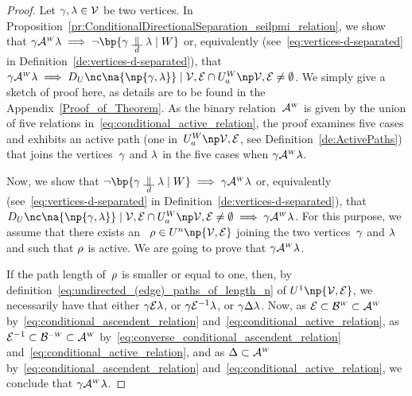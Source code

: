 \documentclass[12pt]{article}
\begin{document}
{{{{{\begin{proof}
  Let \( \gamma,\lambda \in {\cal V} \) be two vertices. 
  In Proposition~\ref{pr:ConditionalDirectionalSeparation_seilpmi_relation},
  we show that 
  \( \bgent \ConditionalActive \cgent \implies 
  \neg \bp{\bgent \ConditionalDirectionalSeparation \cgent \mid \AgentSubsetW}
  \) or, equivalently (see~\eqref{eq:vertices-d-separated} in
  Definition~\ref{de:vertices-d-separated}), that 
  \(  \bgent {\ConditionalActive} \cgent \implies
  \DeploymentInUPaths{\na{\np{\bgent,\cgent}}}{\graph} 
  \cap \ActiveUndirectedPaths{\graph} 
  \neq\emptyset \).
  We simply give a sketch of proof here, as details are to be found in the Appendix~\ref{Proof_of_Theorem}. 
  As the binary relation~\(  \mathcal{A}^{\text{\tiny $W$}} \) is given by the union of five
  relations in~\eqref{eq:conditional_active_relation},
  the proof examines five cases and exhibits an active path
  (one in~\( \ActiveUndirectedPaths{\graph} \), see Definition~\ref{de:ActivePaths})
  that joins the vertices~\( \gamma \) and \( \lambda \) in the five cases
  when \( \gamma \mathcal{A}^{\text{\tiny $W$}} \lambda \). 
  \medskip

  Now,  we show that 
  \( \neg \bp{\bgent \ConditionalDirectionalSeparation \cgent \mid \AgentSubsetW}
  \implies \bgent \ConditionalActive \cgent \) or, equivalently (see~\eqref{eq:vertices-d-separated} in
  Definition~\ref{de:vertices-d-separated}), that 
  \(
  \DeploymentInUPaths{\na{\np{\bgent,\cgent}}}{\graph} 
  \cap \ActiveUndirectedPaths{\graph} 
  \neq\emptyset 
  \implies
  \bgent {\ConditionalActive} \cgent \).
  For this purpose, we assume that there exists an \undirectedEdgePath\
  \( \UndirectedPath \in \UPATH^{n}\np{\graph} \)
  joining the two vertices~$\gamma$ and $\lambda$ and such that \( \rho
  \) is active.
  We are going to prove that $\gamma \mathcal{A}^{\text{\tiny $W$}}\lambda$.
  
  If the path length of~\( \rho \) is smaller or equal to one, then,
  by definition~\eqref{eq:undirected_(edge)_paths_of_length_n} of
  $\UPATH^{1}\np{\OrientedGraph}$, we necessarily have that
  either $\gamma {\cal E}\lambda$, or $\gamma {\cal E}^{-1}\lambda$,
  or $\gamma \Delta\lambda$.
  Now, as \( {\cal E} \subset \mathcal{B}^{\text{\tiny $W$}} \subset
  \mathcal{A}^{\text{\tiny $W$}} \)
  by~\eqref{eq:conditional_ascendent_relation}
  and~\eqref{eq:conditional_active_relation}, 
  as \( {\cal E}^{-1} \subset \mathcal{B}^{\text{\tiny$-W$}} \subset
  \mathcal{A}^{\text{\tiny $W$}} \)
  by~\eqref{eq:converse_conditional_ascendent_relation}
  and~\eqref{eq:conditional_active_relation}, 
  and as \( \Delta \subset \mathcal{A}^{\text{\tiny $W$}} \)
  by~\eqref{eq:conditional_ascendent_relation}
  and~\eqref{eq:conditional_active_relation},
  we conclude that $\gamma \mathcal{A}^{\text{\tiny $W$}} \lambda$.
  

\end{proof}}}}}}
\end{document}
